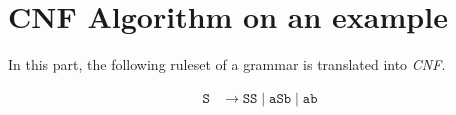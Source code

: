 \documentclass[a4paper, 11pt]{article}
\begin{document}
























\newpage
\section{CNF Algorithm on an example}

\label{createcnf}

In this part, the following ruleset of a grammar is translated into \textit{CNF}.

\begin{align*}
\texttt{S} & \rightarrow \texttt{SS} \mid  \texttt{aSb} \mid \texttt{ab} 
\end{align*}
\end{document}
